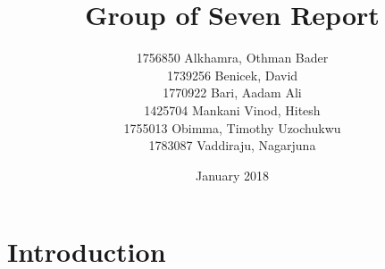 \documentclass{article}
\title{Group of Seven Report}
\author{1756850 Alkhamra, Othman Bader \\
1739256 Benicek, David \\
1770922 Bari, Aadam Ali \\
1425704 Mankani Vinod, Hitesh \\
1755013 Obimma, Timothy Uzochukwu \\ 
1783087 Vaddiraju, Nagarjuna}
\date{January 2018}
\begin{document}
\maketitle

\section{Introduction}






\end{document}
